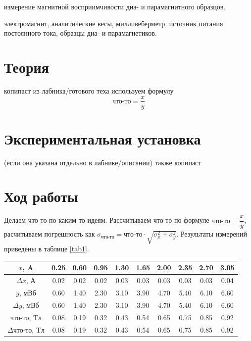 \documentclass[a4paper,12pt]{article}
\begin{document}
\author{Рябых Владислав и Исыпов Илья, Б05-905}
\title{}
\maketitle

 измерение магнитной восприимчивости диа- и парамагнитного образцов.

 электромагнит, аналитические весы, милливеберметр, источник питания постоянного тока, образцы диа- и парамагнетиков.


\section*{Теория}
копипаст из лабника/готового теха
используем формулу
\begin{equation}
	\text{что-то} = \dfrac{x}{y}
	\label{eq1}
\end{equation}

\section*{Экспериментальная установка}
(если она указана отдельно в лабнике/описании) также копипаст

\section*{Ход работы}
Делаем что-то по каким-то идеям. Рассчитываем что-то по формуле $\text{что-то} = \dfrac{x}{y}$, расчитываем погрешность как $\sigma_\text{что-то} = \text{что-то} \cdot \sqrt{\sigma_x^2 + \sigma_y^2}$. Результаты измерений приведены в таблице \ref{tab1}.

\begin{center}
\begin{tabular}{|c|c|c|c|c|c|c|c|c|c|}
	\hline
	$x$, A & 0.25 & 0.60 & 0.95 & 1.30 & 1.65 & 2.00 & 2.35 & 2.70 & 3.05 \\
	\hline
	$\Delta x$, А & 0.02 & 0.02 & 0.02 & 0.03 & 0.03 & 0.03 & 0.03 & 0.03 & 0.04 \\
	\hline
	$y$, мВб & 0.60 & 1.40 & 2.30 & 3.10 & 3.90 & 4.70 & 5.40 & 6.10 & 6.60 \\
	\hline
	$\Delta y$, мВб & 0.60 & 1.40 & 2.30 & 3.10 & 3.90 & 4.70 & 5.40 & 6.10 & 6.60 \\
	\hline
	$\text{что-то}$, Tл & 0.08 & 0.19 & 0.32 & 0.43 & 0.54 & 0.65 & 0.75 & 0.85 & 0.92 \\
	\hline
	$\Delta \text{что-то}$, Tл & 0.08 & 0.19 & 0.32 & 0.43 & 0.54 & 0.65 & 0.75 & 0.85 & 0.92 \\
	\hline
\end{tabular}
	\label{tab1}
\end{center}
\end{document}
